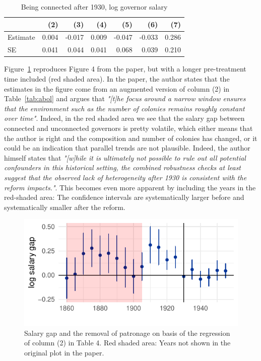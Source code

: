 \documentclass[a4paper]{article}\usepackage[]{graphicx}\usepackage[]{color}
\makeatletter
\def\maxwidth{ %
  \ifdim\Gin@nat@width>\linewidth
    \linewidth
  \else
    \Gin@nat@width
  \fi
}
\makeatother
\begin{document}
\begin{table}[!h]

\caption{\label{tab:combo}Being connected after 1930, log governor salary}
\centering
\fontsize{7}{9}\selectfont
\begin{tabular}[t]{lrrrrrr}
\toprule
  & (2) & (3) & (4) & (5) & (6) & (7)\\
\midrule
Estimate & 0.004 & -0.017 & 0.009 & -0.047 & -0.033 & 0.286\\
SE & 0.041 & 0.044 & 0.041 & 0.068 & 0.039 & 0.210\\
\bottomrule
\end{tabular}
\end{table}


\hspace*{5mm} Figure~\ref{fig:plot3} reproduces Figure 4 from the paper, but with a longer pre-treatment time included (red shaded area). In the paper, the author states that the estimates in the figure come from an augmented version of column (2) in Table~\ref{tab:abol} and argues that \textit{"[t]he focus around a narrow window ensures that the environment such as the number of colonies remains roughly constant over time"}\parencite[p.3186]{guoxu2018}. Indeed, in the red shaded area we see that the salary gap between connected and unconnected governors is pretty volatile, which either means that the author is right and the composition and number of colonies has changed, or it could be an indication that parallel trends are not plausible. Indeed, the author himself states that \textit{"[w]hile it is ultimately not possible to rule out all potential confounders in this historical setting, the combined robustness checks at least suggest that the observed lack of heterogeneity after 1930 is consistent with the reform impacts."}\parencite[p.3187]{guoxu2018}. This becomes even more apparent by including the years in the red-shaded area: The confidence intervals are systematically larger before and systematically smaller after the reform.
\begin{figure}

{\centering \includegraphics[width=\maxwidth]{figure/plot3-1} 

}

\caption[Salary gap and the removal of patronage on basis of the regression of column (2) in Table 4]{Salary gap and the removal of patronage on basis of the regression of column (2) in Table 4. Red shaded area: Years not shown in the original plot in the paper.}\label{fig:plot3}
\end{figure}
\end{document}
